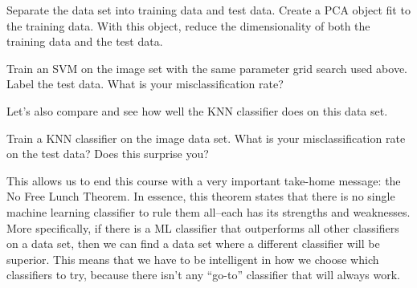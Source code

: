 \begin{problem}
Separate the data set into training data and test data. Create a PCA object fit to the training data. With this object, reduce the dimensionality of both the training data and the test data.
\end{problem}

\begin{problem}
Train an SVM on the image set with the same parameter grid search used above. Label the test data. What is your misclassification rate?
\end{problem}

Let's also compare and see how well the KNN classifier does on this data set.

\begin{problem}
Train a KNN classifier on the image data set. What is your misclassification rate on the test data? Does this surprise you?
\end{problem}

This allows us to end this course with a very important take-home message: the No Free Lunch Theorem. In essence, this theorem states that there is no single machine learning classifier to rule them all--each has its strengths and weaknesses. More specifically, if there is a ML classifier that outperforms all other classifiers on a data set, then we can find a data set where a different classifier will be superior. This means that we have to be intelligent in how we choose which classifiers to try, because there isn't any ``go-to'' classifier that will always work.
